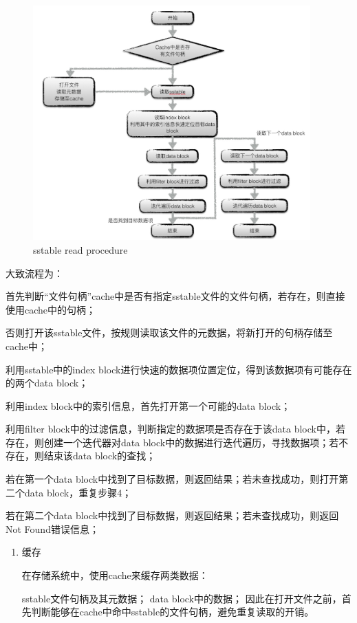 \begin{enumerate}
\begin{enumerate}
\begin{figure}[H]
	\centering
	\includegraphics[width=0.95\textwidth]{images/sstable_read_procedure.jpeg}
	\caption{sstable read procedure}
	\label{sstable_read_procedure}
\end{figure}

大致流程为：

首先判断“文件句柄”cache中是否有指定sstable文件的文件句柄，若存在，则直接使用cache中的句柄；

否则打开该sstable文件，按规则读取该文件的元数据，将新打开的句柄存储至cache中；

利用sstable中的index block进行快速的数据项位置定位，得到该数据项有可能存在的两个data block；

利用index block中的索引信息，首先打开第一个可能的data block；

利用filter block中的过滤信息，判断指定的数据项是否存在于该data block中，若存在，则创建一个迭代器对data block中的数据进行迭代遍历，寻找数据项；若不存在，则结束该data block的查找；

若在第一个data block中找到了目标数据，则返回结果；若未查找成功，则打开第二个data block，重复步骤4；

若在第二个data block中找到了目标数据，则返回结果；若未查找成功，则返回Not Found错误信息；

		\begin{enumerate}
			\item 缓存 
			

			在存储系统中，使用cache来缓存两类数据：

sstable文件句柄及其元数据；
data block中的数据；
因此在打开文件之前，首先判断能够在cache中命中sstable的文件句柄，避免重复读取的开销。


\end{enumerate}
\end{enumerate}
\end{enumerate}
